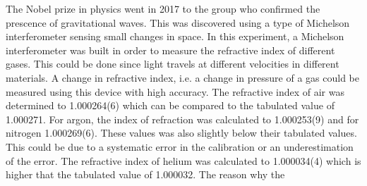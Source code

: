 The Nobel prize in physics went in 2017 to the group who confirmed the prescence of gravitational waves. This was discovered using a type of Michelson interferometer sensing small changes in space. In this experiment, a Michelson interferometer was built in order to measure the refractive index of different gases. This could be done since light travels at different velocities in different materials. A change in refractive index, i.e. a change in pressure of a gas could be measured using this device with high accuracy. The refractive index of air was determined to 1.000264(6) which can be compared to the tabulated value of 1.000271. For argon, the index of refraction was calculated to 1.000253(9) and for nitrogen 1.000269(6). These values was also slightly below their tabulated values. This could be due to a systematic error in the calibration or an underestimation of the error. The refractive index of helium was calculated to 1.000034(4) which is higher that the tabulated value of 1.000032. The reason why the 
